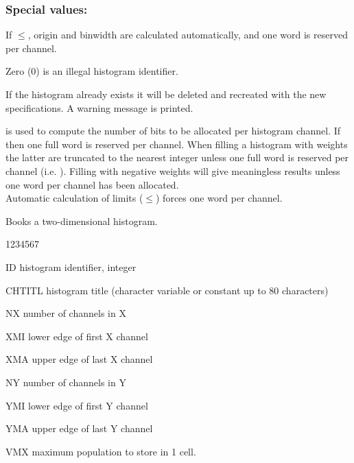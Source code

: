 \subsubsection*{Special values:}
\begin{UL}
\item If $\leq$, origin and binwidth are
      calculated automatically, and one word is reserved per channel.
\item Zero (0) is an illegal histogram identifier.
\item If the histogram  already exists it will be deleted and
      recreated with the new specifications. A warning message is printed.
\item {} is used to compute the number
      of bits to be allocated per histogram channel.
      If  then one full word is reserved per channel.
      When filling a histogram with weights the latter are
      truncated to the nearest integer unless one full word is
      reserved per channel (i.e. ).
      Filling with negative weights will give meaningless results
      unless one word per channel has been allocated.\\
      Automatic calculation of limits ($\leq$)
      forces one word per channel.
\end{UL}



\Action Books a two-dimensional histogram.
\Idesc
\begin{DLtt}{1234567}
\item[ID] histogram identifier, integer
\item[CHTITL] histogram title  
              (character variable or constant up to 80 characters)
\item[NX] number of channels in X
\item[XMI] lower edge of first X channel
\item[XMA] upper edge of last X channel
\item[NY] number of channels in Y
\item[YMI] lower edge of first Y channel
\item[YMA] upper edge of last Y channel
\item[VMX] maximum population to store in 1 cell.
\end{DLtt}

